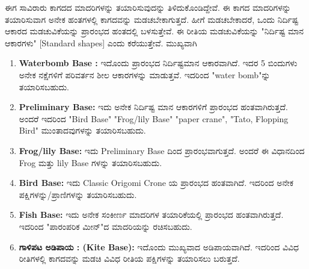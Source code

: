  ಈಗ ಸಾವಿರಾರು ಕಾಗದದ ಮಾದರಿಗಳನ್ನು ತಯಾರಿಸುವುದನ್ನು ತಿಳಿದುಕೊಂಡಿದ್ದೇವೆ. ಈ ಕಾಗದ ಮಾದರಿಗಳನ್ನು ತಯಾರಿಸುವಾಗ ಅನೇಕ ಹಂತಗಳಲ್ಲಿ ಕಾಗದವನ್ನು ಮಡಚಬೇಕಾಗುತ್ತದೆ. ಹೀಗೆ ಮಡಚಬೇಕಾದರೆ, ಒಂದು ನಿರ್ದಿಷ್ಟ ಆಕಾರದ ಮಡಚುವಿಕೆಯನ್ನು ಪ್ರಾರಂಭದ ಹಂತದಲ್ಲಿ ಬಳಸುತ್ತೇವೆ. ಈ ರೀತಿಯ ಮಡಚುವಿಕೆಯನ್ನು "ನಿರ್ದಿಷ್ಟ ಮಾನ ಆಕಾರಗಳು" [Standard shapes] ಎಂದು ಕರೆಯುತ್ತೇವೆ. ಮುಖ್ಯವಾಗಿ 
 \begin{enumerate}
  \item[{\bf [a]}] \textbf{Waterbomb Base :} ಇದೊಂದು ಪ್ರಾರಂಭದ ನಿರ್ದಿಷ್ಟಮಾನ ಆಕಾರ\-ವಾಗಿದೆ. ಇದರ 5 ಬಿಂದುಗಳು ಅನೇಕ ನಕ್ಷೆಗಳಿಗೆ ಪರಿವರ್ತನ ಶೀಲ ಆಕಾರಗಳನ್ನು ಮಾಡುತ್ತವೆ. ಇದರಿಂದ "water bomb"ನ್ನು ತಯಾರಿಸಬಹುದು.

\medskip
  
  \item[{\bf [b]}] \textbf{Preliminary Base:} ಇದು ಅನೇಕ ನಿರ್ದಿಷ್ಟ ಮಾನ ಆಕಾರಗಳಿಗೆ ಪ್ರಾರಂಭದ ಹಂತವಾಗಿರುತ್ತದೆ. ಅಂದರೆ ಇದರಿಂದ "Bird Base" "Frog/lily Base" "paper crane", "Tato, Flopping Bird"  ಮುಂತಾದವುಗಳನ್ನು ತಯಾರಿಸಬಹುದು.  

\medskip
  
  \item[{\bf [c]}] \textbf{Frog/lily Base:} ಇದು Preliminary Base ದಿಂದ ಪ್ರಾರಂಭವಾಗುತ್ತದೆ. ಅಂದರೆ ಈ ವಿಧಾನದಿಂದ Frog ಮತ್ತು lily Base ಗಳನ್ನು ತಯಾರಿಸಬಹುದು.

\medskip
   
  \item[{\bf [d]}] \textbf{Bird  Base:} ಇದು Classic Origomi Crone ಯ ಪ್ರಾರಂಭದ ಹಂತವಾಗಿದೆ. ಇದರಿಂದ ಅನೇಕ ಪಕ್ಷಿಗಳನ್ನು/ಪ್ರಾಣಿಗಳನ್ನು ತಯಾರಿಸಬಹುದು. 


  \medskip
  
  \item[{\bf [e]}] \textbf{Fish Base:}  ಇದು ಅನೇಕ ಸಂಕೀರ್ಣ ಮಾದರಿಗಳ ತಯಾರಿಕೆಯಲ್ಲಿ ಪ್ರಾರಂಭದ ಹಂತವಾಗಿರುತ್ತದೆ. ಇದರಿಂದ "ಪಾರಂಪರಿಕ ಮೀನ್"ದ ಮಾದರಿಯನ್ನು ರಚಿಸಬಹುದು.
  
  \medskip
  
  \item[{\bf [f]}] \textbf{ಗಾಳಿಪಟ ಅಡಿಪಾಯ : (Kite Base):} ಇದೊಂದು ಮುಖ್ಯವಾದ ಅಡಿಪಾಯವಾಗಿದೆ. ಇದರಿಂದ ವಿವಿಧ ರೀತಿಗಳಲ್ಲಿ ಕಾಗದವನ್ನು ಮಡಚಿ ವಿವಿಧ ರೀತಿಯ ಪಕ್ಷಿಗಳನ್ನು ತಯಾರಿಸಲು ಬರುತ್ತದೆ. 
\end{enumerate}

